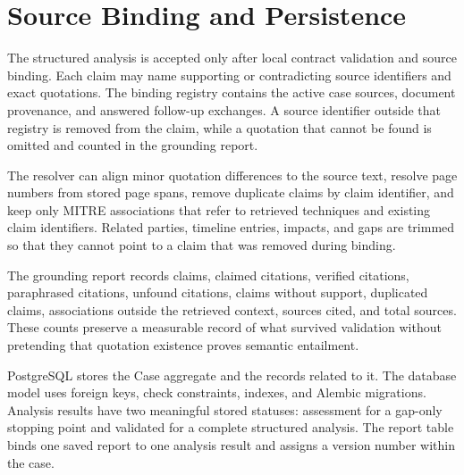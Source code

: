 \section{Source Binding and Persistence}

The structured analysis is accepted only after local contract validation and source binding. Each claim may name supporting or contradicting source identifiers and exact quotations. The binding registry contains the active case sources, document provenance, and answered follow-up exchanges. A source identifier outside that registry is removed from the claim, while a quotation that cannot be found is omitted and counted in the grounding report.

The resolver can align minor quotation differences to the source text, resolve page numbers from stored page spans, remove duplicate claims by claim identifier, and keep only MITRE associations that refer to retrieved techniques and existing claim identifiers. Related parties, timeline entries, impacts, and gaps are trimmed so that they cannot point to a claim that was removed during binding.

The grounding report records claims, claimed citations, verified citations, paraphrased citations, unfound citations, claims without support, duplicated claims, associations outside the retrieved context, sources cited, and total sources. These counts preserve a measurable record of what survived validation without pretending that quotation existence proves semantic entailment.

PostgreSQL stores the Case aggregate and the records related to it. The database model uses foreign keys, check constraints, indexes, and Alembic migrations. Analysis results have two meaningful stored statuses: assessment for a gap-only stopping point and validated for a complete structured analysis. The report table binds one saved report to one analysis result and assigns a version number within the case.

